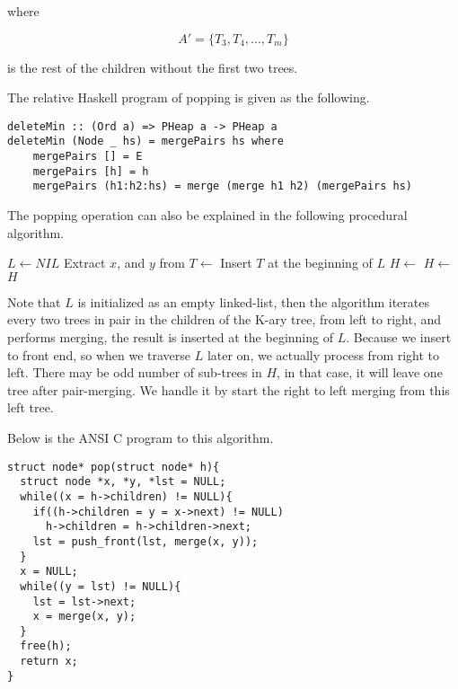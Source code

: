 \documentclass{article}
\begin{document}
where

\[
A' = \{ T_3, T_4, ..., T_m\}
\]

is the rest of the children without the first two trees.

The relative Haskell program of popping is given as the following.

\lstset{language=Haskell}
\begin{lstlisting}
deleteMin :: (Ord a) => PHeap a -> PHeap a
deleteMin (Node _ hs) = mergePairs hs where
    mergePairs [] = E
    mergePairs [h] = h
    mergePairs (h1:h2:hs) = merge (merge h1 h2) (mergePairs hs)
\end{lstlisting}

The popping operation can also be explained in the following 
procedural algorithm.

\begin{algorithmic}[1]
  \State $L \gets NIL$
    \State Extract $x$, and $y$ from 
    \State $T \gets $ 
    \State Insert $T$ at the beginning of $L$
  \EndFor
  \State $H \gets $  
    \State $H \gets $ 
  \EndFor
  \State \Return $H$
\EndFunction
\end{algorithmic}

Note that $L$ is initialized as an empty linked-list, then the algorithm
iterates every two trees in pair in the children of the K-ary tree, from
left to right, and performs merging, the result is inserted at the beginning
of $L$. Because we insert to front end, so when we traverse $L$ later on,
we actually process from right to left. There may be odd number of sub-trees
in $H$, in that case, it will leave one tree after pair-merging. We
handle it by start the right to left merging from this left tree.

Below is the ANSI C program to this algorithm.

\lstset{language=C}
\begin{lstlisting}
struct node* pop(struct node* h){
  struct node *x, *y, *lst = NULL;
  while((x = h->children) != NULL){
    if((h->children = y = x->next) != NULL)
      h->children = h->children->next;
    lst = push_front(lst, merge(x, y));
  }
  x = NULL;
  while((y = lst) != NULL){
    lst = lst->next;
    x = merge(x, y);
  }
  free(h);
  return x;
}
\end{lstlisting}
\end{document}
